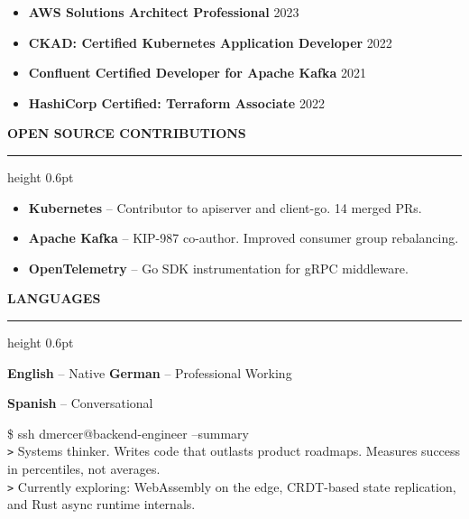 \documentclass[11pt,a4paper]{article}
\newcommand{\tsection}[1]{%
  \vspace{6pt}
  {\large\bfseries\color{terminalDark}#1}
  \vspace{2pt}
  \hrule height 0.6pt
  \vspace{4pt}
}
\begin{document}
\begin{minipage}[t]{0.40\textwidth}
\vspace{3pt}
\begin{itemize}[leftmargin=*,nosep,itemsep=1pt]
  \item {\color{terminalDark}\textbf{AWS Solutions Architect Professional}} \hfill {\color{terminalGray}\footnotesize 2023}
  \item {\color{terminalDark}\textbf{CKAD: Certified Kubernetes Application Developer}} \hfill {\color{terminalGray}\footnotesize 2022}
  \item {\color{terminalDark}\textbf{Confluent Certified Developer for Apache Kafka}} \hfill {\color{terminalGray}\footnotesize 2021}
  \item {\color{terminalDark}\textbf{HashiCorp Certified: Terraform Associate}} \hfill {\color{terminalGray}\footnotesize 2022}
\end{itemize}

\tsection{OPEN SOURCE CONTRIBUTIONS}

\vspace{3pt}
\begin{itemize}[leftmargin=*,nosep,itemsep=1pt]
  \item {\color{terminalDark}\textbf{Kubernetes}} -- Contributor to apiserver and client-go. 14 merged PRs.
  \item {\color{terminalDark}\textbf{Apache Kafka}} -- KIP-987 co-author. Improved consumer group rebalancing.
  \item {\color{terminalDark}\textbf{OpenTelemetry}} -- Go SDK instrumentation for gRPC middleware.
\end{itemize}

\tsection{LANGUAGES}

\vspace{3pt}
{\color{terminalDark}\textbf{English}} -- Native \hfill {\color{terminalDark}\textbf{German}} -- Professional Working\par
{\color{terminalDark}\textbf{Spanish}} -- Conversational

\end{minipage}

\vspace{6pt}

\begin{terminalbox}
{\color{terminalGreen}\footnotesize\faTerminal\enspace\$ ssh dmercer@backend-engineer --summary}\\[2pt]
{\color{terminalCyan}\footnotesize\texttt{>} Systems thinker. Writes code that outlasts product roadmaps. Measures success in percentiles, not averages.}\\[2pt]
{\color{terminalCyan}\footnotesize\texttt{>} Currently exploring: WebAssembly on the edge, CRDT-based state replication, and Rust async runtime internals.}
\end{terminalbox}
\end{document}
